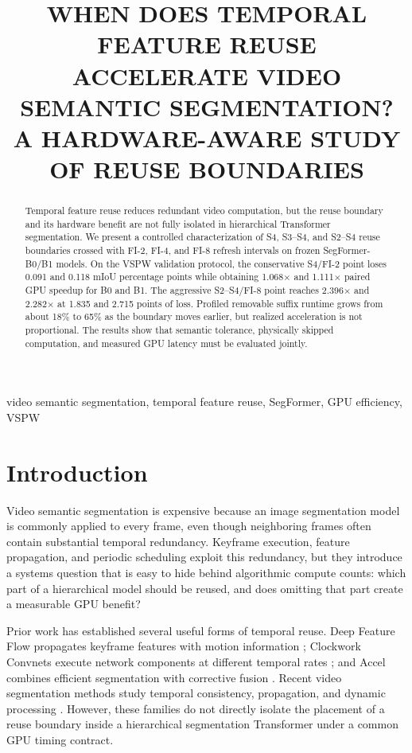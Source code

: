 \documentclass{article}
\title{WHEN DOES TEMPORAL FEATURE REUSE ACCELERATE VIDEO SEMANTIC SEGMENTATION?\\A HARDWARE-AWARE STUDY OF REUSE BOUNDARIES}
\begin{document}
\ninept
\maketitle

\begin{abstract}
Temporal feature reuse reduces redundant video computation, but the reuse boundary and its hardware benefit are not fully isolated in hierarchical Transformer segmentation. We present a controlled characterization of S4, S3--S4, and S2--S4 reuse boundaries crossed with FI-2, FI-4, and FI-8 refresh intervals on frozen SegFormer-B0/B1 models. On the VSPW validation protocol, the conservative S4/FI-2 point loses 0.091 and 0.118 mIoU percentage points while obtaining 1.068$\times$ and 1.111$\times$ paired GPU speedup for B0 and B1. The aggressive S2--S4/FI-8 point reaches 2.396$\times$ and 2.282$\times$ at 1.835 and 2.715 points of loss. Profiled removable suffix runtime grows from about 18\% to 65\% as the boundary moves earlier, but realized acceleration is not proportional. The results show that semantic tolerance, physically skipped computation, and measured GPU latency must be evaluated jointly.
\end{abstract}

\begin{keywords}
video semantic segmentation, temporal feature reuse, SegFormer, GPU efficiency, VSPW
\end{keywords}

\section{Introduction}
Video semantic segmentation is expensive because an image segmentation model is commonly applied to every frame, even though neighboring frames often contain substantial temporal redundancy. Keyframe execution, feature propagation, and periodic scheduling exploit this redundancy, but they introduce a systems question that is easy to hide behind algorithmic compute counts: which part of a hierarchical model should be reused, and does omitting that part create a measurable GPU benefit?

Prior work has established several useful forms of temporal reuse. Deep Feature Flow propagates keyframe features with motion information \cite{zhu2017dff}; Clockwork Convnets execute network components at different temporal rates \cite{shelhamer2016clockwork}; and Accel combines efficient segmentation with corrective fusion \cite{jain2019accel}. Recent video segmentation methods study temporal consistency, propagation, and dynamic processing \cite{baghbaderani2024bofp,liu2024dovit,hu2023arseg}. However, these families do not directly isolate the placement of a reuse boundary inside a hierarchical segmentation Transformer under a common GPU timing contract.
\end{document}
